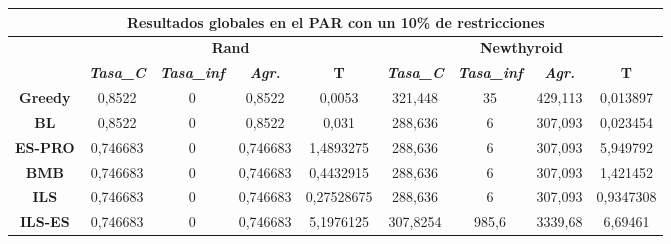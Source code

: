 \documentclass[12pt, spanish]{article}
\begin{document}
\begin{table}[H]
\begin{tabular}{|c|c|c|c|c|c|c|c|c|}
\hline
\multicolumn{9}{|c|}{\textbf{Resultados globales en el PAR con un 10\% de restricciones}}                                                                                                                      \\ \hline
\multicolumn{1}{|l|}{\multirow{2}{*}{}} & \multicolumn{4}{c|}{\textbf{Rand}}                                                            & \multicolumn{4}{c|}{\textbf{Newthyroid}}                                                      \\ \cline{2-9} 
\multicolumn{1}{|l|}{}                  & \textit{\textbf{Tasa\_C}} & \textit{\textbf{Tasa\_inf}} & \textit{\textbf{Agr.}} & \textbf{T} & \textit{\textbf{Tasa\_C}} & \textit{\textbf{Tasa\_inf}} & \textit{\textbf{Agr.}} & \textbf{T} \\ \hline
\textbf{Greedy}                         & 0,8522                    & 0                           & 0,8522                 & 0,0053     & 321,448                   & 35                          & 429,113                & 0,013897   \\ \hline
\textbf{BL}                             & 0,8522                    & 0                           & 0,8522                 & 0,031      & 288,636                   & 6                           & 307,093                & 0,023454   \\ \hline
\textbf{ES-PRO}                & 0,746683                  & 0                           & 0,746683               & 1,4893275  & 288,636                   & 6                           & 307,093                & 5,949792   \\ \hline
\textbf{BMB}                            & 0,746683                  & 0                           & 0,746683               & 0,4432915  & 288,636                   & 6                           & 307,093                & 1,421452   \\ \hline
\textbf{ILS}                            & 0,746683                  & 0                           & 0,746683               & 0,27528675 & 288,636                   & 6                           & 307,093                & 0,9347308  \\ \hline
\textbf{ILS-ES}                         & 0,746683                  & 0                           & 0,746683               & 5,1976125  & 307,8254                  & 985,6                       & 3339,68                & 6,69461    \\ \hline
\end{tabular}
\end{table}
\end{document}
